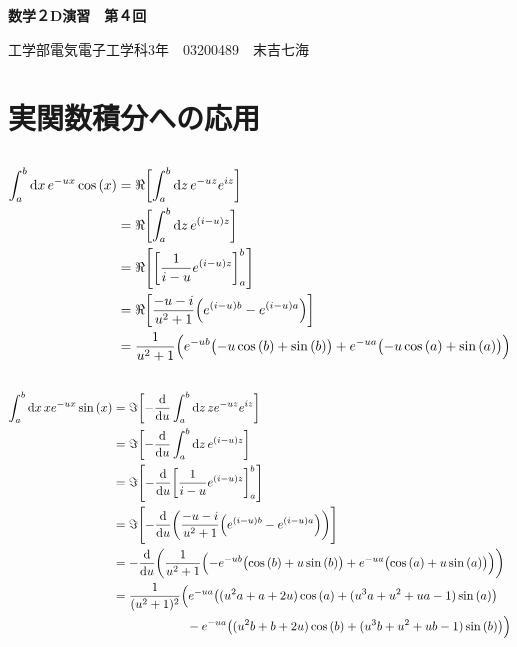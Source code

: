 \documentclass[dvipdfmx,a4paper]{jsarticle}
\begin{document}
\begin{center}
\textbf{\huge{数学２D演習　第４回}}
\end{center}

\begin{flushright}
工学部電気電子工学科3年　03200489　末吉七海\\
\end{flushright}

\section{実関数積分への応用}

\subsection{}
\begin{align*}
\int_a^b\mathrm{d}x \, e^{-ux}\cos{(x)}& = \Re{\biggl[\int_a^b\mathrm{d}z \, e^{-uz}e^{iz}\biggr]}\\
&= \Re{\biggl[\int_a^b\mathrm{d}z \, e^{(i-u)z}\biggr]}\\
&= \Re \Biggl[\biggl[\frac{1}{i-u}e^{(i-u)z}\biggr]_a^b\Biggr]\\
&= \Re \biggl[\frac{-u-i}{u^2+1}\Bigl(e^{(i-u)b} - e^{(i-u)a}\Bigr)\biggr]\\
&=\frac{1}{u^2+1}\Bigl(e^{-ub}\bigl(-u\cos{(b)} + \sin{(b)}\bigr) + e^{-ua}\bigl(-u\cos{(a)} + \sin{(a)}\bigr)\Bigr)\\
\end{align*}

\subsection{}
\begin{align*}
\int_a^b\mathrm{d}x \, xe^{-ux}\sin{(x)}& = \Im {\biggl[-\frac{\mathrm{d}}{\mathrm{d}u}\int_a^b\mathrm{d}z \, ze^{-uz}e^{iz}\biggr]}\\
&= \Im{\biggl[-\frac{\mathrm{d}}{\mathrm{d}u}\int_a^b\mathrm{d}z \, e^{(i-u)z}\biggr]}\\
&= \Im \Biggl[-\frac{\mathrm{d}}{\mathrm{d}u}\biggl[\frac{1}{i-u}e^{(i-u)z}\biggr]_a^b\Biggr]\\
&= \Im \Biggl[-\frac{\mathrm{d}}{\mathrm{d}u}\biggl(\frac{-u-i}{u^2+1}\Bigl(e^{(i-u)b} - e^{(i-u)a}\Bigr)\biggr)\Biggl]\\
&=-\frac{\mathrm{d}}{\mathrm{d}u}\biggl(\frac{1}{u^2+1}\Bigl(-e^{-ub}\bigl(\cos{(b)} + u\sin{(b)}\bigr) + e^{-ua}\bigl(\cos{(a)} + u\sin{(a)}\bigr)\Bigr)\biggr)\\
&= \frac{1}{(u^2+1)^2}\Bigl(e^{-ua}\bigl((u^2 a + a + 2u)\cos{(a)} + (u^3a + u^2 + ua -1)\sin{(a)}\bigr)\\ 
&\qquad \qquad \qquad- e^{-ua}\bigl((u^2 b + b + 2u)\cos{(b)} + (u^3b + u^2 + ub -1)\sin{(b)}\bigr)\Bigr)\\
\end{align*}
\end{document}
